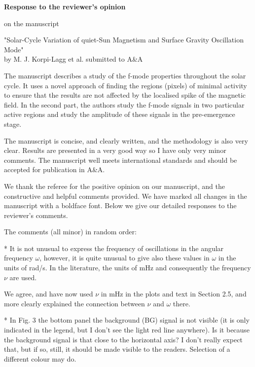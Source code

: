 \documentclass[12pt, letterpaper]{article}
\newcommand{\blue}{\color{blue}}
\begin{document}
\begin{center}

{\bf Response to the reviewer's opinion 

on the manuscript

"Solar-Cycle Variation of quiet-Sun Magnetism and Surface Gravity Oscillation Mode" \\ by M. J. Korpi-Lagg et al. submitted to A\&A}

\end{center}

{\blue The manuscript describes a study of the f-mode properties throughout the solar cycle. It uses a novel approach of finding the regions (pixels) of minimal activity to ensure that the results are not affected by the localised spike of the magnetic field. In the second part, the authors study the f-mode signals in two particular active regions and study the amplitude of these signals in the pre-emergence stage.

The manuscript is concise, and clearly written, and the methodology is also very clear. Results are presented in a very good way so I have only very minor comments. The manuscript well meets international standards and should be accepted for publication in A\&A.}

\medskip \noindent We thank the referee for the positive opinion on our manuscript, and the constructive and helpful comments provided. We have marked all changes in the manuscript with a boldface font. Below we give our detailed responses to the reviewer's comments. \medskip

{\blue The comments (all minor) in random order:}

{\blue * It is not unusual to express the frequency of oscillations in the angular frequency $\omega$, however, it is quite unusual to give also these values in $\omega$ in the units of rad/s. In the literature, the units of mHz and consequently the frequency $\nu$ are used.}

\medskip \noindent We agree, and have now used $\nu$ in mHz in the plots and text in Section 2.5, and more clearly explained the connection between $\nu$ and $\omega$ there. \medskip

{\blue * In Fig. 3 the bottom panel the background (BG) signal is not visible (it is only indicated in the legend, but I don't see the light red line anywhere). Is it because the background signal is that close to the horizontal axis? I don't really expect that, but if so, still, it should be made visible to the readers. Selection of a different colour may do.}
\end{document}

